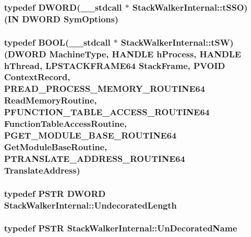 \hypertarget{class_stack_walker_internal_ad5e78468cabdf8dea0f3b5bf02e23498}{
\subsubsection[{t\-S\-S\-O}]{\setlength{\rightskip}{0pt plus 5cm}typedef {\bf D\-W\-O\-R\-D}(\-\_\-\-\_\-stdcall $\ast$ Stack\-Walker\-Internal\-::t\-S\-S\-O)(I\-N {\bf D\-W\-O\-R\-D} Sym\-Options)}}\label{class_stack_walker_internal_ad5e78468cabdf8dea0f3b5bf02e23498}
\hypertarget{class_stack_walker_internal_a23455d3c1a4ebe202187adca43bab297}{
\subsubsection[{t\-S\-W}]{\setlength{\rightskip}{0pt plus 5cm}typedef {\bf B\-O\-O\-L}(\-\_\-\-\_\-stdcall $\ast$ Stack\-Walker\-Internal\-::t\-S\-W)({\bf D\-W\-O\-R\-D} Machine\-Type, H\-A\-N\-D\-L\-E h\-Process, H\-A\-N\-D\-L\-E h\-Thread, {\bf L\-P\-S\-T\-A\-C\-K\-F\-R\-A\-M\-E64} Stack\-Frame, P\-V\-O\-I\-D Context\-Record, {\bf P\-R\-E\-A\-D\-\_\-\-P\-R\-O\-C\-E\-S\-S\-\_\-\-M\-E\-M\-O\-R\-Y\-\_\-\-R\-O\-U\-T\-I\-N\-E64} Read\-Memory\-Routine, {\bf P\-F\-U\-N\-C\-T\-I\-O\-N\-\_\-\-T\-A\-B\-L\-E\-\_\-\-A\-C\-C\-E\-S\-S\-\_\-\-R\-O\-U\-T\-I\-N\-E64} Function\-Table\-Access\-Routine, {\bf P\-G\-E\-T\-\_\-\-M\-O\-D\-U\-L\-E\-\_\-\-B\-A\-S\-E\-\_\-\-R\-O\-U\-T\-I\-N\-E64} Get\-Module\-Base\-Routine, {\bf P\-T\-R\-A\-N\-S\-L\-A\-T\-E\-\_\-\-A\-D\-D\-R\-E\-S\-S\-\_\-\-R\-O\-U\-T\-I\-N\-E64} Translate\-Address)}}\label{class_stack_walker_internal_a23455d3c1a4ebe202187adca43bab297}
\hypertarget{class_stack_walker_internal_afa139c697f1b3698f423baa43bf334ba}{
\subsubsection[{Undecorated\-Length}]{\setlength{\rightskip}{0pt plus 5cm}typedef P\-S\-T\-R {\bf D\-W\-O\-R\-D} {\bf Stack\-Walker\-Internal\-::\-Undecorated\-Length}}}\label{class_stack_walker_internal_afa139c697f1b3698f423baa43bf334ba}
\hypertarget{class_stack_walker_internal_a8ca1f29d26c0da0f660be5f77cf68dd0}{
\subsubsection[{Un\-Decorated\-Name}]{\setlength{\rightskip}{0pt plus 5cm}typedef P\-S\-T\-R {\bf Stack\-Walker\-Internal\-::\-Un\-Decorated\-Name}}}\label{class_stack_walker_internal_a8ca1f29d26c0da0f660be5f77cf68dd0}


